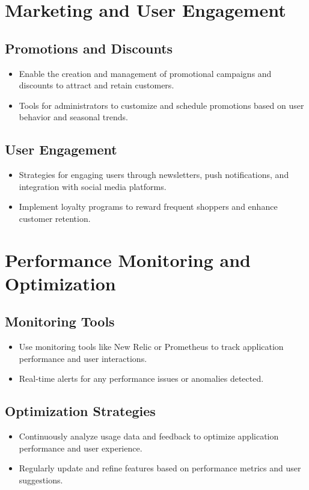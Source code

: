 \documentclass[11pt]{article}
\begin{document}
	\section*{Marketing and User Engagement}
	
	\subsection*{Promotions and Discounts}
	\begin{itemize}
		\item Enable the creation and management of promotional campaigns and discounts to attract and retain customers.
		\item Tools for administrators to customize and schedule promotions based on user behavior and seasonal trends.
	\end{itemize}
	
	\subsection*{User Engagement}
	\begin{itemize}
		\item Strategies for engaging users through newsletters, push notifications, and integration with social media platforms.
		\item Implement loyalty programs to reward frequent shoppers and enhance customer retention.
	\end{itemize}
	
	\section*{Performance Monitoring and Optimization}
	
	\subsection*{Monitoring Tools}
	\begin{itemize}
		\item Use monitoring tools like New Relic or Prometheus to track application performance and user interactions.
		\item Real-time alerts for any performance issues or anomalies detected.
	\end{itemize}
	
	\subsection*{Optimization Strategies}
	\begin{itemize}
		\item Continuously analyze usage data and feedback to optimize application performance and user experience.
		\item Regularly update and refine features based on performance metrics and user suggestions.
	\end{itemize}
	
\end{document}
